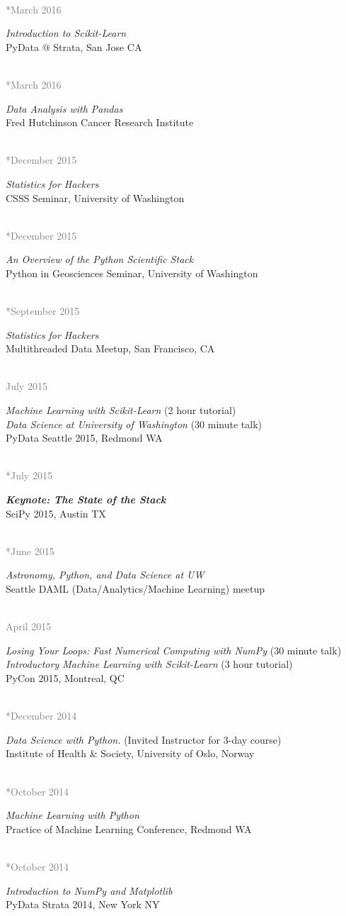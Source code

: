 \documentclass{article} %
\def\bf{\bfseries}
\newlength\sidebarwidth
\newcommand{\dateonly}[2][]
	 {\begin{minipage}{\textwidth}
	 \vspace*{.4\baselineskip}
         \nopagebreak\hspace{0in}%
         \nopagebreak\begin{minipage}[t]{\sidebarwidth - .2cm}
         \raggedleft {~}
         {\\[-\baselineskip] \textcolor{gray}{\footnotesize #1}}
	 \end{minipage}%
	 \hfill
	 \begin{minipage}[t]{\linewidth - \sidebarwidth}
	 #2%
	 \end{minipage}%
	 \vspace*{.2\baselineskip plus 1\baselineskip minus
	 .2\baselineskip}%
	 \end{minipage}}
\begin{document}
  \dateonly[**March 2016]{
      {\it Introduction to Scikit-Learn}\\
      PyData @ Strata, San Jose CA
  }

  \dateonly[**March 2016]{
      {\it Data Analysis with Pandas}\\
      Fred Hutchinson Cancer Research Institute
  }

  \dateonly[**December 2015]{
      {\it Statistics for Hackers}\\
      CSSS Seminar, University of Washington
  }

  \dateonly[**December 2015]{
      {\it An Overview of the Python Scientific Stack}\\
      Python in Geosciences Seminar, University of Washington
  }

  \dateonly[**September 2015]{
      {\it Statistics for Hackers}\\
      Multithreaded Data Meetup, San Francisco, CA
  }

  \dateonly[July 2015]{
    {\it Machine Learning with Scikit-Learn} (2 hour tutorial)\\
    {\it Data Science at University of Washington} (30 minute talk)\\
    PyData Seattle 2015, Redmond WA
  }

  \dateonly[**July 2015]{
    {\it {\bf Keynote: The State of the Stack}}\\
    SciPy 2015, Austin TX
  }

  \dateonly[**June 2015]{
    {\it Astronomy, Python, and Data Science at UW}\\
    Seattle DAML (Data/Analytics/Machine Learning) meetup
  }

  \dateonly[April 2015]{
    {\it Losing Your Loops: Fast Numerical Computing with NumPy} (30 minute talk)\\
    {\it Introductory Machine Learning with Scikit-Learn} (3 hour tutorial)\\
    PyCon 2015, Montreal, QC
  }

  \dateonly[**December 2014]{
    {\it Data Science with Python.} (Invited Instructor for 3-day course)\\
    Institute of Health \& Society, University of Oslo, Norway
  }

  \dateonly[**October 2014]{
    {\it Machine Learning with Python}\\
    Practice of Machine Learning Conference, Redmond WA
  }

  \dateonly[**October 2014]{
    {\it Introduction to NumPy and Matplotlib}\\
    PyData \@ Strata 2014, New York NY
  }
\end{document}
